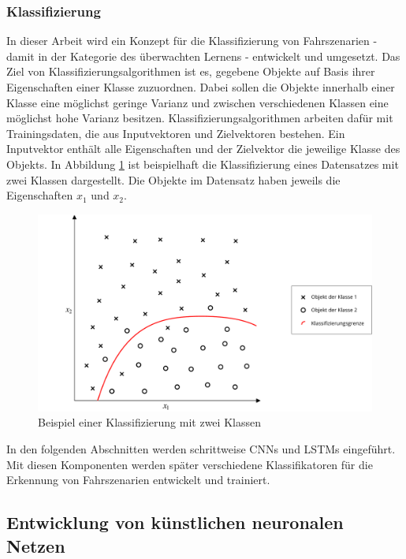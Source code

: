 \subsubsection{Klassifizierung}

In dieser Arbeit wird ein Konzept für die Klassifizierung von Fahrszenarien - damit in der Kategorie des überwachten Lernens - entwickelt und umgesetzt. Das Ziel von Klassifizierungsalgorithmen ist es, gegebene Objekte auf Basis ihrer Eigenschaften einer Klasse zuzuordnen. Dabei sollen die Objekte innerhalb einer Klasse eine möglichst geringe Varianz und zwischen verschiedenen Klassen eine möglichst hohe Varianz besitzen. Klassifizierungsalgorithmen arbeiten dafür mit Trainingsdaten, die aus Inputvektoren und Zielvektoren bestehen. Ein Inputvektor enthält alle Eigenschaften und der Zielvektor die jeweilige Klasse des Objekts. In Abbildung \ref{fig_klassifizierung} ist beispielhaft die Klassifizierung eines Datensatzes mit zwei Klassen dargestellt. Die Objekte im Datensatz haben jeweils die Eigenschaften $x_1$ und $x_2$.

\begin{figure}[h]
\centering
\includegraphics[scale=0.5]{images/klassifizierung.pdf}
\caption{Beispiel einer Klassifizierung mit zwei Klassen}
\label{fig_klassifizierung}
\end{figure}

In den folgenden Abschnitten werden schrittweise \acp{CNN} und \acp{LSTM} eingeführt. Mit diesen Komponenten werden später verschiedene Klassifikatoren für die Erkennung von Fahrszenarien entwickelt und trainiert.


\subsection{Entwicklung von künstlichen neuronalen Netzen}
\label{grundlagen_nn_entwicklung}


